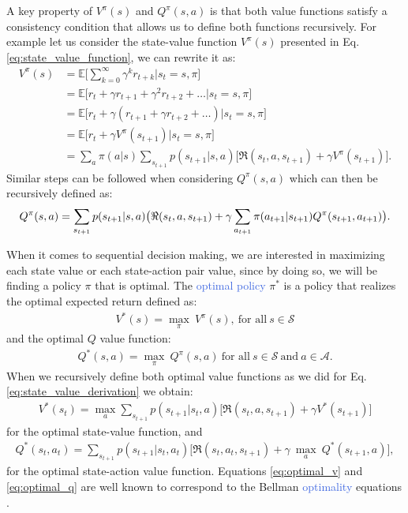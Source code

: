 A key property of $V^{\pi}(s)$ and $Q^{\pi}(s,a)$ is that both value functions satisfy a consistency condition that allows us to define both functions recursively. For example let us consider the state-value function $V^{\pi}(s)$ presented in Eq. \ref{eq:state_value_function}, we can rewrite it as:
\begin{equation}
\begin{split}
 V^{\pi}(s) & =\mathds{E}\big[\sum_{k=0}^{\infty}\gamma^{k}r_{t+k}\big| s_t = s, \pi \big] \\ 
 & =\mathds{E}\big[r_{t}+\gamma r_{t+1}+\gamma^{2}r_{t+2}+\ldots \big| s_t =s , \pi \big] \\ 
 & =\mathds{E}\big[r_{t}+\gamma(r_{t+1}+\gamma r_{t+2}+\ldots)\big| s_t =s , \pi \big] \\
 & =\mathds{E}\big[r_{t}+\gamma V^{\pi}(s_{t+1}) \big| s_t =s , \pi \big] \\
 & =\sum_a \pi(a|s) \sum_{s_{t+1}} p(s_{t+1}|s,a)\big[\Re(s_t, a, s_{t+1}) + \gamma V^{\pi}(s_{t+1}) \big].
\end{split}
\label{eq:state_value_derivation}
\end{equation}
Similar steps can be followed when considering $Q^{\pi}(s,a)$ which can then be recursively defined as:
\begin{equation}
	Q^{\pi}(s,a) = \sum_{s_{t+1}} p(s_{t+1}|s,a)\big(\Re(s_t, a, s_{t+1}) + \\ \gamma \sum_{a_{t+1}} \pi(a_{t+1}|s_{t+1}) Q^{\pi}(s_{t+1}, a_{t+1}) \big).
\end{equation}

When it comes to sequential decision making, we are interested in maximizing each state value or each state-action pair value, since by doing so, we will be finding a policy $\pi$ that is optimal. The \textcolor{RoyalBlue}{optimal policy} $\pi^{*}$ is a policy that realizes the optimal expected return defined as:
\begin{align}
 V^{*}(s)=\underset{\pi}{\max}\:V^{\pi}(s), \ \text{for all} \ s\in\mathcal{S}
\end{align}
and the optimal $Q$ value function:
\begin{align}
Q^{*}(s,a)= \underset{\pi}{\max}\:Q^{\pi}(s,a) \ \text{for all} \ s\in\mathcal{S} \ \text{and} \ a \in\mathcal{    A}.
\end{align}
When we recursively define both optimal value functions as we did for Eq. \ref{eq:state_value_derivation} we obtain:
\begin{align}
    V^{*}(s_t) = \underset{a}{\max}\sum_{s_{t+1}}p(s_{t+1} | s_{t}, a) \bigg[\Re (s_{t}, a, s_{t+1}) + \gamma V^{*}(s_{t+1}) \bigg]
    \label{eq:optimal_v}
\end{align}
for the optimal state-value function, and
\begin{multline}
    Q^{*}(s_t,a_t)=\sum_{s_{t+1}}p(s_{t+1} | s_{t}, a_{t})  \bigg[\Re (s_{t}, a_{t}, s_{t+1}) + \gamma \: \underset{a}{\max} \: Q^{*}(s_{t+1}, a) \bigg],
    \label{eq:optimal_q}
\end{multline}
for the optimal state-action value function. Equations \ref{eq:optimal_v} and \ref{eq:optimal_q} are well known to correspond to the Bellman \textcolor{RoyalBlue}{optimality} equations \cite{bellman1966dynamic}. 

